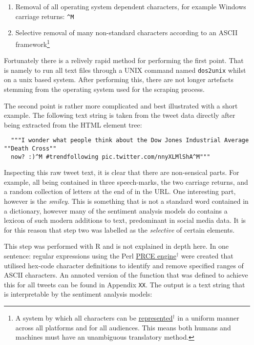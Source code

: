 \documentclass{article}
\begin{document}
\begin{enumerate}
\item Removal of all operating system dependent characters, for example Windows carriage returns: \texttt{\textasciicircum{}M}

\item Selective removal of many non-standard characters according to an ASCII framework\footnote{A system by which all characters can be \href{http://www.asciitable.com/}{represented$^{\dag{}}$} in a uniform manner across all platforms and for all audiences. This means both humans and machines must have an unambiguous translatory method.}
\end{enumerate}

Fortunately there is a relively rapid method for performing the first point. That is namely to run all text files through a UNIX command named \texttt{dos2unix} whilst on a unix based system. After performing this, there are not longer artefacts stemming from the operating system used for the scraping process.

The second point is rather more complicated and best illustrated with a short example. The following text string is taken from the tweet data directly after being extracted from the HTML element tree:

\begin{verbatim}
  """I wonder what people think about the Dow Jones Industrial Average ""Death Cross""
  now? :)^M #trendfollowing pic.twitter.com/nnyXLMlShA^M"""
\end{verbatim}

Inspecting this raw tweet text, it is clear that there are non-sensical parts. For example, all being contained in three speech-marks, the two carriage returns, and a random collection of letters at the end of in the URL. One interesting part, however is the \emph{smiley}. This is something that is not a standard word contained in a dictionary, however many of the sentiment analysis models do contains a lexicon of such modern additions to text, predominant in social media data. It is for this reason that step two was labelled as the \emph{selective} of certain elements.

This step was performed with R and is not explained in depth here. In one sentence: regular expressions using the Perl \href{http://www.pcre.org/}{PRCE engine$^{\dag{}}$} were created that utilised hex-code character definitions to identify and remove specified ranges of ASCII characters. An annoted version of the function that was defined to achieve this for all tweets can be found in Appendix \texttt{XX}.
The output is a text string that is interpretable by the sentiment analysis models:
\end{document}
